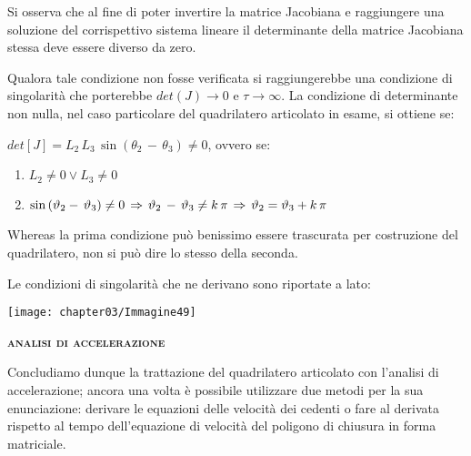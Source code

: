 	Si osserva che al fine di poter invertire la matrice Jacobiana e raggiungere una soluzione del corrispettivo sistema lineare il determinante della matrice Jacobiana stessa deve essere diverso da zero.
	
	Qualora tale condizione non fosse verificata si raggiungerebbe una condizione di singolarità che porterebbe $det(J) \to 0$ e $\tau \to \infty$.
	La condizione di determinante non nulla, nel caso particolare del quadrilatero articolato in esame, si ottiene se: 
	\begin{center}
	$det[J] = L_2\,L_3\,\sin{(\theta_2\,-\,\theta_3)}\ne 0$, ovvero se:
	\end{center}
	
	\begin{minipage}{.5\textwidth}
	\begin{enumerate}[$\rightarrow$]
		\item $L_2 \ne 0 \lor L_3 \ne 0$
		\item $\sin{(\theta_2-\,\theta_3)} \ne 0\hspace{0.5mm} \Rightarrow \hspace{0.5mm} \theta_2\,-\,\theta_3\ne k\,\pi\hspace{0.5mm}\Rightarrow\hspace{0.5mm}\theta_2 = \theta_3 +k\,\pi$
	\end{enumerate}
	
	Whereas la prima condizione può benissimo essere trascurata per costruzione del quadrilatero, non si può dire lo stesso della seconda.
	
	Le condizioni di singolarità che ne derivano sono riportate a lato:
	\end{minipage}
	\hfill
	\begin{minipage}{.5\textwidth}
	\centering
	\texttt{[image: chapter03/Immagine49]}
	\end{minipage}
	
	
	\begin{center}
		{\scshape{\bfseries analisi di accelerazione}}
	\end{center}
			
	
	Concludiamo dunque la trattazione del quadrilatero articolato con l'analisi di accelerazione; ancora una volta è possibile utilizzare due metodi per la sua enunciazione: derivare le equazioni delle velocità dei cedenti o fare al derivata rispetto al tempo dell'equazione di velocità del poligono di chiusura in forma matriciale.
	
